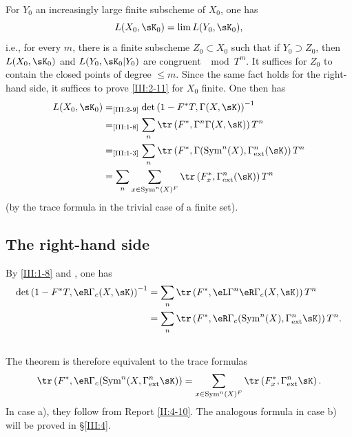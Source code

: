 \documentclass[oneside]{book}
\begin{document}
For $Y_0$ an increasingly large finite subscheme of $X_0$, one has
\[
  L(X_0,\sK_0) = \lim L(Y_0,\sK_0) \text{,}
\]
i.e., for every $m$, there is a finite subscheme $Z_0\subset X_0$ such that
if $Y_0\supset Z_0$, then $L(X_0,\sK_0)$ and $L(Y_0,\sK_0|Y_0)$ are congruent
$\mod T^m$.
It suffices for $Z_0$ to contain the closed points of degree $\leqslant m$.
Since the same fact holds for the right-hand side, it suffices to prove
\ref{III:2-11} for $X_0$ finite. One then has
\begin{align*}
  L(X_0,\sK_0)
    &=_\text{\ref{III:2-9}} \det\left(1-F^* T,\Gamma(X,\sK)\right)^{-1} \\
    &=_\text{\ref{III:1-8}} \sum_n \tr\left(F^*,\Gamma^n \Gamma(X,\sK)\right) T^n \\
    &=_\text{\ref{III:1-3}} \sum_n \tr\left(F^*,\Gamma(\operatorname{Sym}^n(X),\Gamma_\text{ext}^n(\sK)\right) T^n \\
    &= \sum_n \sum_{x\in \operatorname{Sym}^n(X)^F} \tr\left(F_x^*,\Gamma_\text{ext}^n(\sK)\right) T^n
\end{align*}
(by the trace formula in the trivial case of a finite set).






\subsection{The right-hand side}\label{III:2-12}

By \ref{III:1-8} and \cite[XVII 5.5.12]{sga4}, one has
\begin{align*}
  \det\left(1-F^* T,\eR\Gamma_c(X,\sK)\right)^{-1}
    &= \sum_n \tr\left(F^*,\eL\Gamma^n\eR\Gamma_c(X,\sK)\right) T^n \\
    &= \sum_n \tr\left(F^*,\eR\Gamma_c(\operatorname{Sym}^n(X),\Gamma_\text{ext}^n\sK)\right) T^n \text{.}
\end{align*}






\subsection{}\label{III:2-13}

The theorem is therefore equivalent to the trace formulas
\[
  \tr\left(F^*,\eR\Gamma_c(\operatorname{Sym}^n(X,\Gamma_\text{ext}^n \sK)\right) = \sum_{x\in\operatorname{Sym}^n(X)^F} \tr\left(F_x^*,\Gamma_\text{ext}^n\sK\right) \text{.}
\]
In case a), they follow from Report \ref{II:4-10}. The analogous formula in
case b) will be proved in \S\ref{III:4}.
\end{document}
